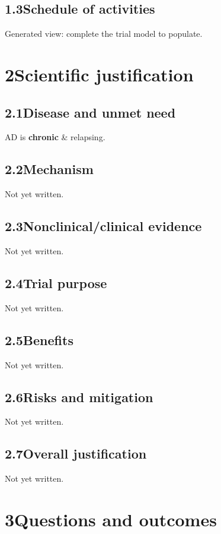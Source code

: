 \documentclass[11pt,a4paper]{article}
\newcommand{\psnote}[2]{\par\noindent\colorbox{#1!8}{\parbox{\dimexpr\linewidth-2\fboxsep}{\small\color{#1}#2}}\par}
\begin{document}
\subsection{1.3\quad Schedule of activities}\label{section.1.3}
\psnote{pswarn}{Generated view: complete the trial model to populate.}
\section{2\quad Scientific justification}\label{section.2}
\subsection{2.1\quad Disease and unmet need}\label{section.2.1}
AD is \textbf{chronic} \& relapsing.

\subsection{2.2\quad Mechanism}\label{section.2.2}
\psnote{pswarn}{Not yet written.}
\subsection{2.3\quad Nonclinical/clinical evidence}\label{section.2.3}
\psnote{pswarn}{Not yet written.}
\subsection{2.4\quad Trial purpose}\label{section.2.4}
\psnote{pswarn}{Not yet written.}
\subsection{2.5\quad Benefits}\label{section.2.5}
\psnote{pswarn}{Not yet written.}
\subsection{2.6\quad Risks and mitigation}\label{section.2.6}
\psnote{pswarn}{Not yet written.}
\subsection{2.7\quad Overall justification}\label{section.2.7}
\psnote{pswarn}{Not yet written.}
\section{3\quad Questions and outcomes}\label{section.3}
\end{document}
